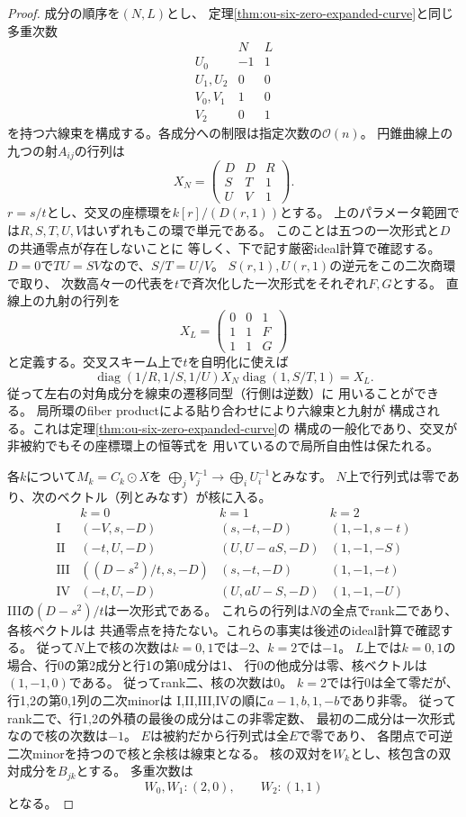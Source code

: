 \begin{proof}
成分の順序を$(N,L)$とし、
定理\ref{thm:ou-six-zero-expanded-curve}と同じ多重次数
\[
\begin{array}{c|rr}
&N&L\\ \hline
U_0&-1&1\\
U_1,U_2&0&0\\
V_0,V_1&1&0\\
V_2&0&1
\end{array}
\]
を持つ六線束を構成する。各成分への制限は指定次数の$\mathcal O(n)$。
円錐曲線上の九つの射$A_{ij}$の行列は
\[
 X_N=\begin{pmatrix}D&D&R\\S&T&1\\U&V&1\end{pmatrix}.
\]
$r=s/t$とし、交叉の座標環を$k[r]/(D(r,1))$とする。
上のパラメータ範囲では$R,S,T,U,V$はいずれもこの環で単元である。
このことは五つの一次形式と$D$の共通零点が存在しないことに
等しく、下で記す厳密ideal計算で確認する。
$D=0$で$TU=SV$なので、$S/T=U/V$。
$S(r,1),U(r,1)$の逆元をこの二次商環で取り、
次数高々一の代表を$t$で斉次化した一次形式をそれぞれ$F,G$とする。
直線上の九射の行列を
\[
 X_L=\begin{pmatrix}0&0&1\\1&1&F\\1&1&G\end{pmatrix}
\]
と定義する。交叉スキーム上で$t$を自明化に使えば
\[
 \operatorname{diag}(1/R,1/S,1/U)X_N
 \operatorname{diag}(1,S/T,1)=X_L.
\]
従って左右の対角成分を線束の遷移同型（行側は逆数）に
用いることができる。
局所環のfiber productによる貼り合わせにより六線束と九射が
構成される。これは定理\ref{thm:ou-six-zero-expanded-curve}の
構成の一般化であり、交叉が非被約でもその座標環上の恒等式を
用いているので局所自由性は保たれる。

各$k$について$M_k=C_k\odot X$を
$\bigoplus_j V_j^{-1}\to\bigoplus_i U_i^{-1}$とみなす。
$N$上で行列式は零であり、次のベクトル（列とみなす）が核に入る。
\[
\begin{array}{c|ccc}
 &k=0&k=1&k=2\\ \hline
\mathrm{I}&(-V,s,-D)&(s,-t,-D)&(1,-1,s-t)\\
\mathrm{II}&(-t,U,-D)&(U,U-aS,-D)&(1,-1,-S)\\
\mathrm{III}&((D-s^2)/t,s,-D)&(s,-t,-D)&(1,-1,-t)\\
\mathrm{IV}&(-t,U,-D)&(U,aU-S,-D)&(1,-1,-U)
\end{array}
\]
IIIの$(D-s^2)/t$は一次形式である。
これらの行列は$N$の全点でrank二であり、各核ベクトルは
共通零点を持たない。これらの事実は後述のideal計算で確認する。
従って$N$上で核の次数は$k=0,1$では$-2$、$k=2$では$-1$。
$L$上では$k=0,1$の場合、行0の第2成分と行1の第0成分は1、
行0の他成分は零、核ベクトルは$(1,-1,0)$である。
従ってrank二、核の次数は0。
$k=2$では行0は全て零だが、行1,2の第0,1列の二次minorは
I,II,III,IVの順に$a-1,b,1,-b$であり非零。
従ってrank二で、行1,2の外積の最後の成分はこの非零定数、
最初の二成分は一次形式なので核の次数は$-1$。
$E$は被約だから行列式は全$E$で零であり、
各閉点で可逆二次minorを持つので核と余核は線束となる。
核の双対を$W_k$とし、核包含の双対成分を$B_{jk}$とする。
多重次数は
\[
 W_0,W_1:(2,0),\qquad W_2:(1,1)
\]
となる。


\end{proof}

